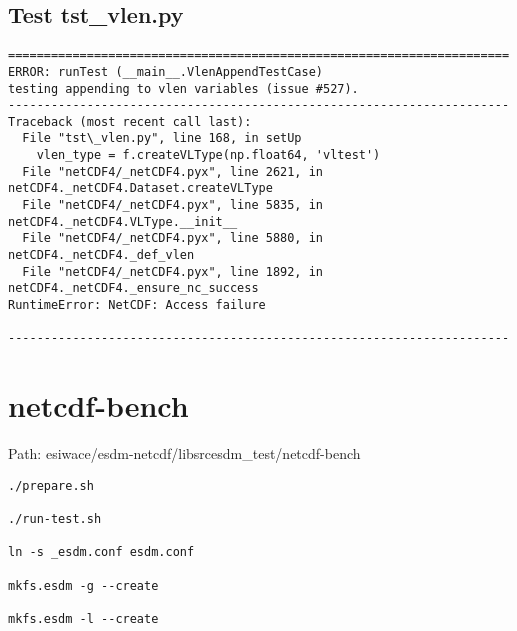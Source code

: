 \section{Test tst\_vlen.py}

\begin{verbatim}
======================================================================
ERROR: runTest (__main__.VlenAppendTestCase)
testing appending to vlen variables (issue #527).
----------------------------------------------------------------------
Traceback (most recent call last):
  File "tst\_vlen.py", line 168, in setUp
    vlen_type = f.createVLType(np.float64, 'vltest')
  File "netCDF4/_netCDF4.pyx", line 2621, in netCDF4._netCDF4.Dataset.createVLType
  File "netCDF4/_netCDF4.pyx", line 5835, in netCDF4._netCDF4.VLType.__init__
  File "netCDF4/_netCDF4.pyx", line 5880, in netCDF4._netCDF4._def_vlen
  File "netCDF4/_netCDF4.pyx", line 1892, in netCDF4._netCDF4._ensure_nc_success
RuntimeError: NetCDF: Access failure

----------------------------------------------------------------------
\end{verbatim}

\chapter{netcdf-bench}

Path: esiwace/esdm-netcdf/libsrcesdm\_test/netcdf-bench

\begin{verbatim}
./prepare.sh

./run-test.sh

ln -s _esdm.conf esdm.conf

mkfs.esdm -g --create

mkfs.esdm -l --create
\end{verbatim}

